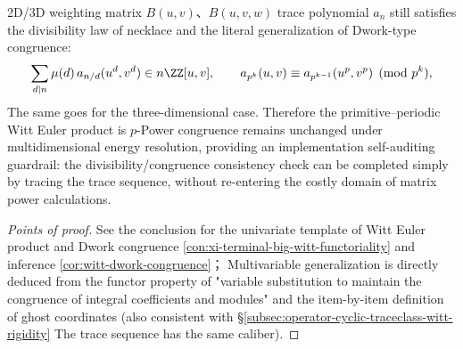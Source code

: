 \begin{conclusion}\label{con:xi-big-witt-dwork-guardrail-multivariable}
2D/3D weighting matrix \(B(u,v)\)、\(B(u,v,w)\) trace polynomial \(a_n\) still satisfies the divisibility law of necklace and the literal generalization of Dwork-type congruence:
\[
\sum_{d\mid n}\mu(d)\,a_{n/d}(u^d,v^d)\in n\ZZ[u,v],
\qquad
a_{p^k}(u,v)\equiv a_{p^{k-1}}(u^p,v^p)\pmod{p^k},
\]
The same goes for the three-dimensional case.
Therefore the primitive--periodic Witt Euler product is \(p\)-Power congruence remains unchanged under multidimensional energy resolution, providing an implementation self-auditing guardrail: the divisibility/congruence consistency check can be completed simply by tracing the trace sequence, without re-entering the costly domain of matrix power calculations.
\end{conclusion}
\begin{proof}[Points of proof]
See the conclusion for the univariate template of Witt Euler product and Dwork congruence \ref{con:xi-terminal-big-witt-functoriality} and inference \ref{cor:witt-dwork-congruence}；
Multivariable generalization is directly deduced from the functor property of "variable substitution to maintain the congruence of integral coefficients and modules" and the item-by-item definition of ghost coordinates (also consistent with \S\ref{subsec:operator-cyclic-traceclass-witt-rigidity} The trace sequence has the same caliber).
\end{proof}

